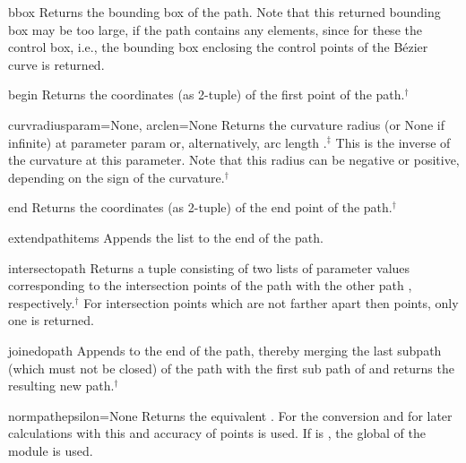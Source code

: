 \begin{methoddesc}{bbox}{}
  Returns the bounding box of the path. Note that this returned
  bounding box may be too large, if the path contains any
   elements, since for these the control box, i.e., the
  bounding box enclosing the control points of the B\'ezier curve is
  returned.
\end{methoddesc}

\begin{methoddesc}{begin}{}
  Returns the coordinates (as 2-tuple) of the first point of the path.$^\dagger$
\end{methoddesc}

\begin{methoddesc}{curvradius}{param=None, arclen=None}
  Returns the curvature radius (or None if infinite) at parameter
  param or, alternatively, arc length .$^\ddagger$ This is
  the inverse of the curvature at this parameter. Note that this
  radius can be negative or positive, depending on the sign of the
  curvature.$^\dagger$
\end{methoddesc}

\begin{methoddesc}{end}{}
  Returns the coordinates (as 2-tuple) of the end point of the path.$^\dagger$
\end{methoddesc}

\begin{methoddesc}{extend}{pathitems}
Appends the list  to the end of the path.
\end{methoddesc}

\begin{methoddesc}{intersect}{opath}
  Returns a tuple consisting of two lists of parameter values
  corresponding to the intersection points of the path with the other
  path , respectively.$^\dagger$ For intersection points which
  are not farther apart then  points, only one is returned.
\end{methoddesc}

\begin{methoddesc}{joined}{opath}
  Appends  to the end of the path, thereby merging the last
  subpath (which must not be closed) of the path with the first sub
  path of  and returns the resulting new path.$^\dagger$
\end{methoddesc}

\begin{methoddesc}{normpath}{epsilon=None}
  Returns the equivalent . For the conversion and for later
  calculations with this  and accuracy of
   points is used. If  is , the
  global  of the  module is used.
\end{methoddesc}

